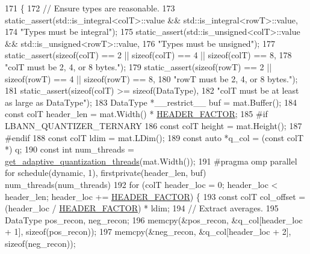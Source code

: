 \begin{DoxyCode}
171                            \{
172   \textcolor{comment}{// Ensure types are reasonable.}
173   static\_assert(std::is\_integral<colT>::value && std::is\_integral<rowT>::value,
174                 \textcolor{stringliteral}{"Types must be integral"});
175   static\_assert(std::is\_unsigned<colT>::value && std::is\_unsigned<rowT>::value,
176                 \textcolor{stringliteral}{"Types must be unsigned"});
177   static\_assert(\textcolor{keyword}{sizeof}(colT) == 2 || \textcolor{keyword}{sizeof}(colT) == 4 || \textcolor{keyword}{sizeof}(colT) == 8,
178                 \textcolor{stringliteral}{"colT must be 2, 4, or 8 bytes."});
179   static\_assert(\textcolor{keyword}{sizeof}(rowT) == 2 || \textcolor{keyword}{sizeof}(rowT) == 4 || \textcolor{keyword}{sizeof}(rowT) == 8,
180                 \textcolor{stringliteral}{"rowT must be 2, 4, or 8 bytes."});
181   static\_assert(\textcolor{keyword}{sizeof}(colT) >= \textcolor{keyword}{sizeof}(DataType),
182                 \textcolor{stringliteral}{"colT must be at least as large as DataType"});
183   DataType *\_\_restrict\_\_ buf = mat.Buffer();
184   \textcolor{keyword}{const} colT header\_len = mat.Width() * \hyperlink{classlbann_1_1lbann__quantizer_afb4315625e371169cabfac56c3f75d37}{HEADER\_FACTOR};
185 \textcolor{preprocessor}{#if LBANN\_QUANTIZER\_TERNARY}
186   \textcolor{keyword}{const} colT height = mat.Height();
187 \textcolor{preprocessor}{#endif}
188   \textcolor{keyword}{const} colT ldim = mat.LDim();
189   \textcolor{keyword}{const} \textcolor{keyword}{auto} *q\_col = (\textcolor{keyword}{const} colT *) q;
190   \textcolor{keyword}{const} \textcolor{keywordtype}{int} num\_threads = \hyperlink{classlbann_1_1lbann__quantizer_aaa0c20f755437130172c40ca8e95bc3f}{get\_adaptive\_quantization\_threads}(mat.Width());
191 \textcolor{preprocessor}{  #pragma omp parallel for schedule(dynamic, 1), firstprivate(header\_len, buf) num\_threads(num\_threads)}
192   \textcolor{keywordflow}{for} (colT header\_loc = 0; header\_loc < header\_len; header\_loc += \hyperlink{classlbann_1_1lbann__quantizer_afb4315625e371169cabfac56c3f75d37}{HEADER\_FACTOR}) \{
193     \textcolor{keyword}{const} colT col\_offset = (header\_loc / \hyperlink{classlbann_1_1lbann__quantizer_afb4315625e371169cabfac56c3f75d37}{HEADER\_FACTOR}) * ldim;
194     \textcolor{comment}{// Extract averages.}
195     DataType pos\_recon, neg\_recon;
196     memcpy(&pos\_recon, &q\_col[header\_loc + 1], \textcolor{keyword}{sizeof}(pos\_recon));
197     memcpy(&neg\_recon, &q\_col[header\_loc + 2], \textcolor{keyword}{sizeof}(neg\_recon));

\end{DoxyCode}
